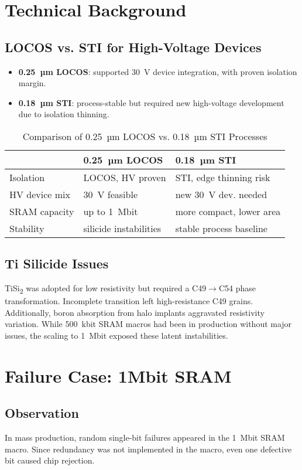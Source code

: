 \documentclass[conference]{IEEEtran}
\begin{document}
\section{Technical Background}
\subsection{LOCOS vs. STI for High-Voltage Devices}
\begin{itemize}
  \item \textbf{0.25~µm LOCOS}: supported 30~V device integration, with proven isolation margin.
  \item \textbf{0.18~µm STI}: process-stable but required new high-voltage development due to isolation thinning.
\end{itemize}

\begin{table}[!t]
\centering
\caption{Comparison of 0.25~µm LOCOS vs. 0.18~µm STI Processes}
\begin{tabular}{@{}lll@{}}
\toprule
 & 0.25~µm LOCOS & 0.18~µm STI \\
\midrule
Isolation & LOCOS, HV proven & STI, edge thinning risk \\
HV device mix & 30~V feasible & new 30~V dev. needed \\
SRAM capacity & up to 1~Mbit & more compact, lower area \\
Stability & silicide instabilities & stable process baseline \\
\bottomrule
\end{tabular}
\end{table}

\subsection{Ti Silicide Issues}
TiSi\textsubscript{2} was adopted for low resistivity but required a C49$\rightarrow$C54 phase transformation.  
Incomplete transition left high-resistance C49 grains.  
Additionally, boron absorption from halo implants aggravated resistivity variation.  
While 500~kbit SRAM macros had been in production without major issues, the scaling to 1~Mbit exposed these latent instabilities.

\section{Failure Case: 1Mbit SRAM}
\subsection{Observation}
In mass production, random single-bit failures appeared in the 1~Mbit SRAM macro.  
Since redundancy was not implemented in the macro, even one defective bit caused chip rejection.
\end{document}
